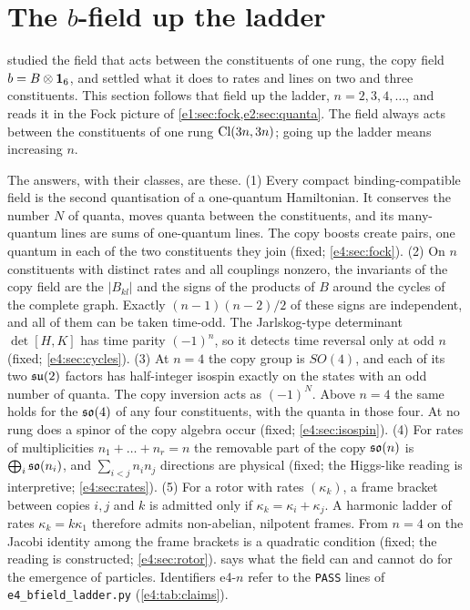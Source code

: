 
\section{\texorpdfstring{The $b$-field up the ladder}{The b-field up the ladder}}
\label{e4:sec:main}

 studied the field that acts between the constituents of one rung, the copy field $b=B\otimes\mathbf 1_6$, and settled what it
does to rates and lines on two and three constituents. This section follows that field up the ladder, $n=2,3,4,\dots$, and reads it in
the Fock picture of \cref{e1:sec:fock,e2:sec:quanta}. The field always acts between the constituents of one rung $\mathrm{Cl}(3n,3n)$; going up the
ladder means increasing $n$.

The answers, with their classes, are these. (1) Every compact binding-compatible field is the second quantisation of a one-quantum
Hamiltonian. It conserves the number $N$ of quanta, moves quanta between the constituents, and its many-quantum lines are sums of
one-quantum lines. The copy boosts create pairs, one quantum in each of the two constituents they join (fixed; \cref{e4:sec:fock}). (2) On $n$
constituents with distinct rates and all couplings nonzero, the invariants of the copy field are the $|B_{kl}|$ and the signs of the
products of $B$ around the cycles of the complete graph. Exactly $(n-1)(n-2)/2$ of these signs are independent, and all of them can be taken
time-odd. The Jarlskog-type determinant $\det[H,K]$ has time parity $(-1)^n$, so it detects time reversal only at odd $n$ (fixed;
\cref{e4:sec:cycles}). (3) At $n=4$ the copy group is $SO(4)$, and each of its two $\mathfrak{su}(2)$ factors has half-integer isospin exactly on the states
with an odd number of quanta. The copy inversion acts as $(-1)^N$. Above $n=4$ the same holds for the $\mathfrak{so}(4)$ of any four constituents, with the
quanta in those four. At no rung does a spinor of the copy algebra occur (fixed; \cref{e4:sec:isospin}). (4) For rates of multiplicities $n_1+\dots+n_r=n$ the removable part of the copy $\mathfrak{so}(n)$ is $\bigoplus_i\mathfrak{so}(n_i)$, and
$\sum_{i<j}n_in_j$ directions are physical (fixed; the Higgs-like reading is interpretive; \cref{e4:sec:rates}). (5) For a rotor with rates
$(\kappa_k)$, a frame bracket between copies $i,j$ and $k$ is admitted only if $\kappa_k=\kappa_i+\kappa_j$. A harmonic ladder of rates
$\kappa_k=k\kappa_1$ therefore admits non-abelian, nilpotent frames. From $n=4$ on the Jacobi identity among the frame brackets is a
quadratic condition (fixed; the reading is constructed; \cref{e4:sec:rotor}).  says what the field can and cannot do for the emergence of particles.
Identifiers e4-$n$ refer to the \texttt{PASS} lines of \texttt{e4\_bfield\_ladder.py} (\cref{e4:tab:claims}).

